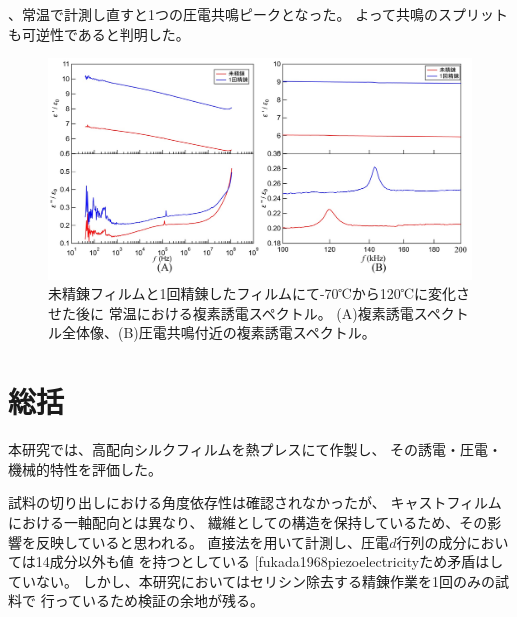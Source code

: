 \documentclass[dvipdfmx,12pt,a4paper]{jreport}
\makeatletter
\DeclareRobustCommand\cite{\unskip
    	\@ifnextchar[{\@tempswatrue\@citex}{\@tempswafalse\@citex[]}}
\makeatother
\begin{document}
			、常温で計測し直すと1つの圧電共鳴ピークとなった。
			よって共鳴のスプリットも可逆性であると判明した。
			\begin{figure}[h]
				\centering
				\includegraphics[width=\linewidth]{0_1_回_精錬_熱処理前後.jpg}
				\caption{未精錬フィルムと1回精錬したフィルムにて-70℃から120℃に変化させた後に
				常温における複素誘電スペクトル。
				(A)複素誘電スペクトル全体像、(B)圧電共鳴付近の複素誘電スペクトル。}
				\label{未精錬_1回精錬_熱処理後}
			\end{figure}
	\chapter{総括}
	本研究では、高配向シルクフィルムを熱プレスにて作製し、
	その誘電・圧電・機械的特性を評価した。
	
	試料の切り出しにおける角度依存性は確認されなかったが、
	キャストフィルムにおける一軸配向とは異なり、
	繊維としての構造を保持しているため、その影響を反映していると思われる。
	直接法を用いて計測し、圧電$d$行列の成分においては14成分以外も値
	を持つとしている\cite{fukada1968piezoelectricity}ため矛盾はしていない。
	しかし、本研究においてはセリシン除去する精錬作業を1回のみの試料で
	行っているため検証の余地が残る。
\end{document}
